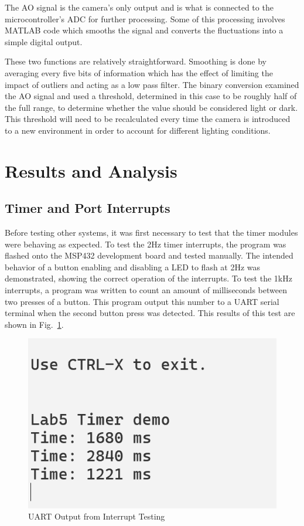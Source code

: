 \documentclass[conference]{IEEEtran}
\begin{document}
The AO signal is the camera's only output and is what is connected to the
microcontroller's ADC for further processing. Some of this processing involves
MATLAB code which smooths the signal and converts the fluctuations into a
simple digital output.

These two functions are relatively straightforward. Smoothing is done by
averaging every five bits of information which has the effect of limiting the
impact of outliers and acting as a low pass filter. The binary
conversion examined the AO signal and used a threshold, determined in this
case to be roughly half of the full range, to
determine whether the value should be considered light or dark. 
This threshold will need to be
recalculated every time the camera is introduced to a new environment in order to
account for different lighting conditions.

\section{Results and Analysis}

\subsection{Timer and Port Interrupts}

Before testing other systems, it was first necessary to test that the timer
modules were behaving as expected. To test the 2Hz timer interrupts, the
program was flashed onto the MSP432 development board and tested manually.
The intended behavior of a button enabling and disabling a LED to flash at
2Hz was demonstrated, showing the correct operation of the interrupts. To
test the 1kHz interrupts, a program was written to count an amount of
milliseconds between two presses of a button. This program output this 
number to a UART serial terminal when the second button press was
detected. This results of this test are shown in Fig.~\ref{part1terminal}.

\begin{figure}
    \centering
    \includegraphics[width=0.7\linewidth]{images/part1terminal.png}
    \caption{UART Output from Interrupt Testing}
    \label{part1terminal}
\end{figure}
\end{document}
